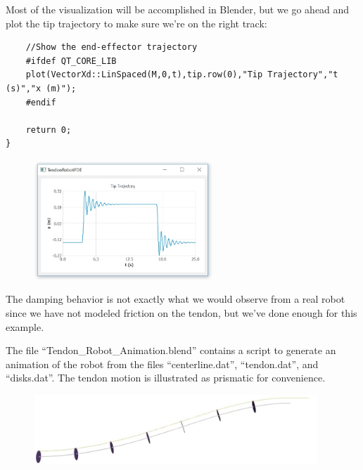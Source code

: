 \documentclass[12pt]{article}
\begin{document}
Most of the visualization will be accomplished in Blender, but we go ahead and plot the tip trajectory to make sure we're on the right track:
\begin{lstlisting}
    //Show the end-effector trajectory
    #ifdef QT_CORE_LIB
    plot(VectorXd::LinSpaced(M,0,t),tip.row(0),"Tip Trajectory","t (s)","x (m)");
    #endif

    return 0;
}
\end{lstlisting}

\begin{figure}[h]
	\centering
		\includegraphics[width=0.6\textwidth]{fig/SolutionPlot.jpg}
	\label{fig:Plot}
\end{figure}
The damping behavior is not exactly what we would observe from a real robot since we have not modeled friction on the tendon, but we've done enough for this example.

The file ``Tendon\_Robot\_Animation.blend'' contains a script to generate an animation of the robot from the files ``centerline.dat'', ``tendon.dat'', and ``disks.dat''. The tendon motion is illustrated as prismatic for convenience.

\begin{figure}[h]
	\centering
		\includegraphics[width=0.95\textwidth]{fig/Render.jpg}
	\label{fig:Render}
\end{figure}
\end{document}
